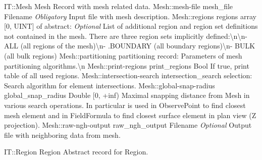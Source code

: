 \begin{RecordType}
	{IT::Mesh}
	{Mesh}
	{}%
	{}%
	{{{Record with mesh related data.}%
}}
		\RecKey
			{Mesh::mesh-file}
			{mesh{\_}file}
			{{Filename}}{}
			{ \it{Obligatory}}
			{{{Input file with mesh description.}%
}}
		\RecKey
			{Mesh::regions}
			{regions}
			{{array [0, UINT] of }{abstract: }}{}
			{ \it{Optional}}
			{{{List of additional region and region set definitions not contained in the mesh.
There are three region sets implicitly defined:{\textbackslash}n{\textbackslash}n- ALL (all regions of the mesh){\textbackslash}n- .BOUNDARY (all boundary regions){\textbackslash}n- BULK (all bulk regions)}%
}}
		\RecKey
			{Mesh::partitioning}
			{partitioning}
			{{record: }}{}
			{ }
			{{{Parameters of mesh partitioning algorithms.{\textbackslash}n}%
}}
		\RecKey
			{Mesh::print-regions}
			{print{\_}regions}
			{{Bool}}{}
			{ }
			{{{If true, print table of all used regions.}%
}}
		\RecKey
			{Mesh::intersection-search}
			{intersection{\_}search}
			{{selection: }}{}
			{ }
			{{{Search algorithm for element intersections.}%
}}
		\RecKey
			{Mesh::global-snap-radius}
			{global{\_}snap{\_}radius}
			{{Double [0, +inf)}}{}
			{ }
			{{{Maximal snapping distance from Mesh in various search operations.
In particular is used in ObservePoint to find closest mesh element and in FieldFormula to find closest surface element in plan view (Z projection).}%
}}
		\RecKey
			{Mesh::raw-ngh-output}
			{raw{\_}ngh{\_}output}
			{{Filename}}{}
			{ \it{Optional}}
			{{{Output file with neighboring data from mesh.}%
}}
\end{RecordType}
\begin{AbstractType}
	{IT::Region}
	{Region}
	{}
	{{{Abstract record for Region.}%
}}
\end{AbstractType}

